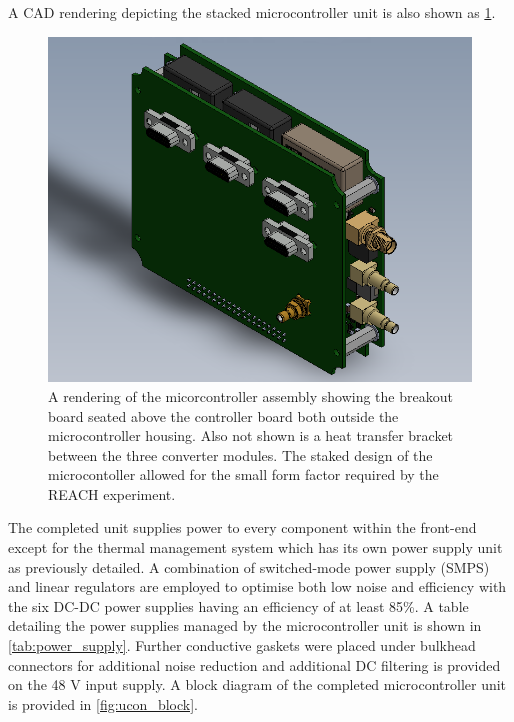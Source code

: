 A CAD rendering depicting the stacked microcontroller unit is also shown as \cref{fig:ucon_cad}.
\begin{figure}
    \centering
    \includegraphics[scale=0.4]{stacked_ucon}
    \caption{A rendering of the micorcontroller assembly showing the breakout board seated above the controller board both outside the microcontroller housing. Also not shown is a heat transfer bracket between the three converter modules. The staked design of the microcontoller allowed for the small form factor required by the REACH experiment.}
    \label{fig:ucon_cad}
\end{figure}
The completed unit supplies power to every component within the front-end except for the thermal management system which has its own power supply unit as previously detailed. A combination of switched-mode power supply (SMPS) and linear regulators are employed to optimise both low noise and efficiency with the six DC-DC power supplies having an efficiency of at least 85\%. A table detailing the power supplies managed by the microcontroller unit is shown in \cref{tab:power_supply}. Further conductive gaskets were placed under bulkhead connectors for additional noise reduction and additional DC filtering is provided on the 48 V input supply. A block diagram of the completed microcontroller unit is provided in \cref{fig:ucon_block}.
